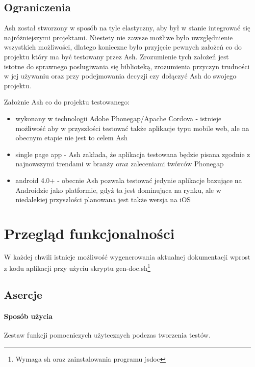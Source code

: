\documentclass[brudnopis]{xmgr}
\begin{document}
\section{Ograniczenia}

Ash został stworzony w sposób na tyle elastyczny, aby był w stanie integrować się najróżniejszymi projektami. Niestety nie zawsze możliwe było uwzględnienie wszystkich możliwości, dlatego konieczne było przyjęcie pewnych założeń co do projektu który ma być testowany przez Ash. Zrozumienie tych założeń jest istotne do sprawnego posługiwania się biblioteką, zrozumienia przyczyn trudności w jej używaniu oraz przy podejmowania decyzji czy dołączyć Ash do swojego projektu.

Założnie Ash co do projektu testowanego:

\begin{itemize}
  \item wykonany w technologii Adobe Phonegap/Apache Cordova - istnieje możliwość aby w przyszłości testować także aplikacje typu mobile web, ale na obecnym etapie nie jest to celem Ash
  \item single page app - Ash zakłada, że aplikacja testowana będzie pisana zgodnie z najnowszymi trendami w branży oraz zaleceniami twórców Phonegap
  \item android 4.0+ - obecnie Ash pozwala testować jedynie aplikacje bazujące na Androidzie jako platformie, gdyż ta jest dominująca na rynku, ale w niedalekiej przyszłości planowana jest także wersja na iOS
\end{itemize}

\chapter{Przegląd funkcjonalności}

W każdej chwili istnieje możliwość wygenerowania aktualnej dokumentacji wprost z kodu aplikacji przy użyciu skryptu gen-doc.sh\footnote{Wymaga sh oraz zainstalowania programu jsdoc}

\section{Asercje}

\subsubsection{Sposób użycia}

Zestaw funkcji pomocniczych użytecznych podczas tworzenia testów.
\end{document}
